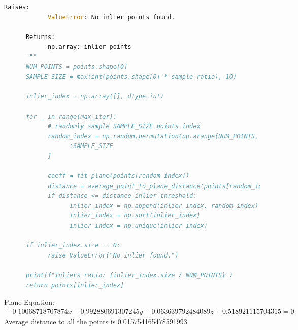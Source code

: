 \documentclass[conference,onecolumn]{IEEEtran}
\begin{document}
\begin{enumerate}[label=\arabic{enumi}.]
\begin{enumerate}
\begin{lstlisting}[language=Python]
      Raises:
            ValueError: No inlier points found.

      Returns:
            np.array: inlier points
      """
      NUM_POINTS = points.shape[0]
      SAMPLE_SIZE = max(int(points.shape[0] * sample_ratio), 10)

      inlier_index = np.array([], dtype=int)

      for _ in range(max_iter):
            # randomly sample SAMPLE_SIZE points index
            random_index = np.random.permutation(np.arange(NUM_POINTS, dtype=int))[
                  :SAMPLE_SIZE
            ]

            coeff = fit_plane(points[random_index])
            distance = average_point_to_plane_distance(points[random_index], coeff)
            if distance <= distance_inlier_threshold:
                  inlier_index = np.append(inlier_index, random_index)
                  inlier_index = np.sort(inlier_index)
                  inlier_index = np.unique(inlier_index)

      if inlier_index.size == 0:
            raise ValueError("No inlier found.")

      print(f"Inliers ratio: {inlier_index.size / NUM_POINTS}")
      return points[inlier_index]
                        \end{lstlisting}
                        Plane Equation:
                        \begin{align*}
                              -0.10068718707874x - 0.992880691307245y - 0.063639792484089z + 0.518921115704315 = 0
                        \end{align*}
                        Average distance to all the points is 0.015754165478591993


\end{enumerate}
\end{enumerate}
\end{document}
